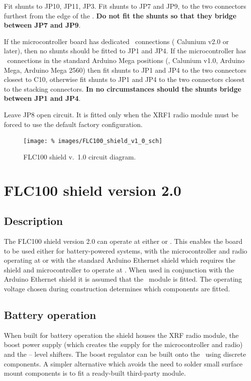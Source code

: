 Fit shunts to JP10, JP11, JP3. Fit shunts to JP7 and JP9, to the two
connectors furthest from the edge of the \pcb. \textbf{Do not fit the
  shunts so that they bridge between JP7 and JP9}.

If the microcontroller board has dedicated \itwoc\ connections (\eg
Calunium v2.0 or later), then no shunts should be fitted to JP1 and
JP4. If the microcontroller has \itwoc\ connections in the standard
Arduino Mega positions (\eg, Calunium v1.0, Arduino Mega, Arduino Mega
2560) then fit shunts to JP1 and JP4 to the two connectors closest to
C10, otherwise fit shunts to JP1 and JP4 to the two connectors closest
to the stacking connectors. \textbf{In no circumstances should the
  shunts bridge between JP1 and JP4}.

Leave JP8 open circuit. It is fitted only when the XRF1 radio module
must be forced to use the default factory configuration.

\begin{landscape}
  \begin{figure}[p]
    \centering
    \texttt{[image: \%
      images/FLC100\_shield\_v1\_0\_sch]}
    \caption{FLC100 shield v.~1.0 circuit diagram.}
    \label{fig:flc100-shield-v1.0-cct-diag}
  \end{figure}
\end{landscape}

\section{FLC100 shield version 2.0}

\subsection{Description}

The FLC100 shield version 2.0 can operate at either  or
. This enables the board to be used either for battery-powered
systems, with the microcontroller and radio operating at  or
with the standard Arduino Ethernet shield which requires the shield
and microcontroller to operate at . When used in conjunction
with the Arduino Ethernet shield it is assumed that the \PoE\ module
is fitted. The operating voltage chosen during construction determines
which components are fitted.


\subsection{Battery operation}
When built for battery operation the shield houses the XRF radio
module, the boost power supply (which creates the  supply
for the microcontroller and radio) and the  -- 
level shifters. The boost regulator can be built onto the \pcb\ using
discrete components. A simpler alternative which avoids the need to
solder small surface mount components is to fit a ready-built
third-party module.


